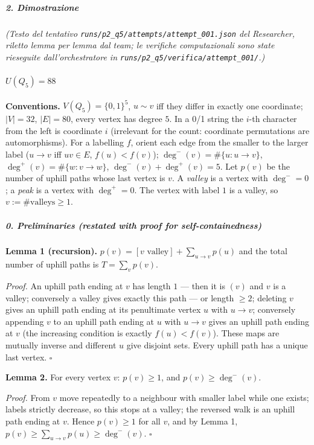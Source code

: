 \documentclass[11pt,a4paper]{article}
\begin{document}
\subparagraph{2. Dimostrazione}\label{dimostrazione}

\emph{(Testo del tentativo
\texttt{runs/p2\_q5/attempts/attempt\_001.json} del Researcher, riletto
lemma per lemma dal team; le verifiche computazionali sono state
rieseguite dall'orchestratore in
\texttt{runs/p2\_q5/verifica/attempt\_001/}.)}

\paragraph{\texorpdfstring{\(U(Q_5) = 88\)}{U(Q\_5) = 88}}\label{uq_5-88}

\textbf{Conventions.} \(V(Q_5)=\{0,1\}^5\), \(u\sim v\) iff they differ
in exactly one coordinate; \(|V|=32\), \(|E|=80\), every vertex has
degree \(5\). In a 0/1 string the \(i\)-th character from the left is
coordinate \(i\) (irrelevant for the count: coordinate permutations are
automorphisms). For a labelling \(f\), orient each edge from the smaller
to the larger label (\(u\to v\) iff \(uv\in E\), \(f(u)<f(v)\));
\(\deg^-(v)=\#\{u:u\to v\}\), \(\deg^+(v)=\#\{w:v\to w\}\),
\(\deg^-(v)+\deg^+(v)=5\). Let \(p(v)\) be the number of uphill paths
whose last vertex is \(v\). A \emph{valley} is a vertex with
\(\deg^-=0\); a \emph{peak} is a vertex with \(\deg^+=0\). The vertex
with label \(1\) is a valley, so \(v:=\#\text{valleys}\ge1\).

\subparagraph{0. Preliminaries (restated with proof for
self-containedness)}\label{preliminaries-restated-with-proof-for-self-containedness}

\textbf{Lemma 1 (recursion).}
\(p(v)=[v\text{ valley}]+\sum_{u\to v}p(u)\) and the total number of
uphill paths is \(T=\sum_v p(v)\).

\emph{Proof.} An uphill path ending at \(v\) has length \(1\) --- then
it is \((v)\) and \(v\) is a valley; conversely a valley gives exactly
this path --- or length \(\ge2\); deleting \(v\) gives an uphill path
ending at its penultimate vertex \(u\) with \(u\to v\); conversely
appending \(v\) to an uphill path ending at \(u\) with \(u\to v\) gives
an uphill path ending at \(v\) (the increasing condition is exactly
\(f(u)<f(v)\)). These maps are mutually inverse and different \(u\) give
disjoint sets. Every uphill path has a unique last vertex. \(\square\)

\textbf{Lemma 2.} For every vertex \(v\): \(p(v)\ge1\), and
\(p(v)\ge\deg^-(v)\).

\emph{Proof.} From \(v\) move repeatedly to a neighbour with smaller
label while one exists; labels strictly decrease, so this stops at a
valley; the reversed walk is an uphill path ending at \(v\). Hence
\(p(v)\ge1\) for all \(v\), and by Lemma 1,
\(p(v)\ge\sum_{u\to v}p(u)\ge\deg^-(v)\). \(\square\)
\end{document}
